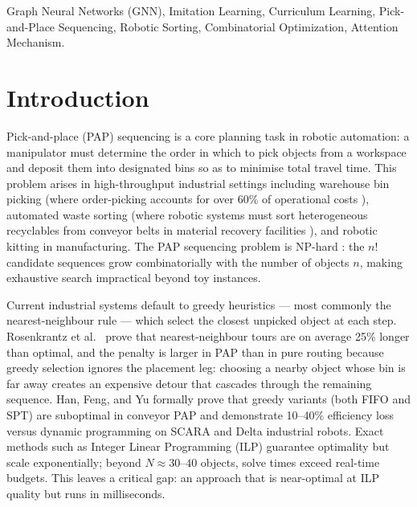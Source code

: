 \documentclass[conference]{IEEEtran}
\begin{document}
\begin{IEEEkeywords}
Graph Neural Networks (GNN), Imitation Learning, Curriculum Learning, Pick-and-Place Sequencing, Robotic Sorting, Combinatorial Optimization, Attention Mechanism.
\end{IEEEkeywords}

\section{Introduction}

Pick-and-place (PAP) sequencing is a core planning task in robotic automation: a manipulator must determine the order in which to pick objects from a workspace and deposit them into designated bins so as to minimise total travel time. This problem arises in high-throughput industrial settings including warehouse bin picking (where order-picking accounts for over 60\% of operational costs \cite{cheng2024drl}), automated waste sorting (where robotic systems must sort heterogeneous recyclables from conveyor belts in material recovery facilities \cite{gundupalli2020sequence}), and robotic kitting in manufacturing. The PAP sequencing problem is NP-hard \cite{chalasani1996}: the $n!$ candidate sequences grow combinatorially with the number of objects $n$, making exhaustive search impractical beyond toy instances.

Current industrial systems default to greedy heuristics --- most commonly the nearest-neighbour rule --- which select the closest unpicked object at each step. Rosenkrantz et al.\ \cite{rosenkrantz1977} prove that nearest-neighbour tours are on average 25\% longer than optimal, and the penalty is larger in PAP than in pure routing because greedy selection ignores the placement leg: choosing a nearby object whose bin is far away creates an expensive detour that cascades through the remaining sequence. Han, Feng, and Yu \cite{han2019pap} formally prove that greedy variants (both FIFO and SPT) are suboptimal in conveyor PAP and demonstrate 10--40\% efficiency loss versus dynamic programming on SCARA and Delta industrial robots. Exact methods such as Integer Linear Programming (ILP) guarantee optimality but scale exponentially; beyond $N \approx 30$--$40$ objects, solve times exceed real-time budgets. This leaves a critical gap: an approach that is near-optimal at ILP quality but runs in milliseconds.
\end{document}
